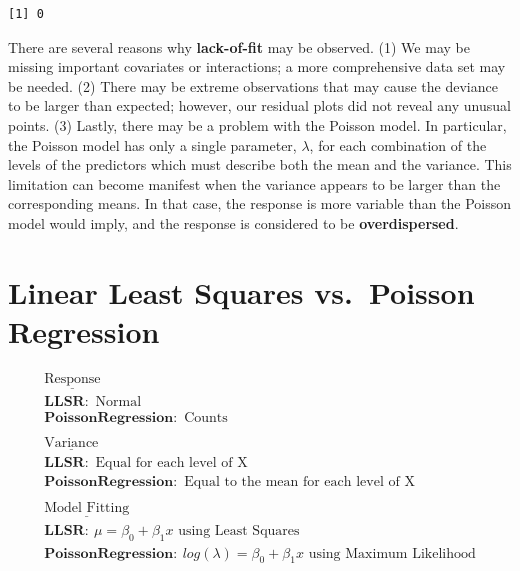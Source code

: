 \documentclass[
]{krantz}
\begin{document}
\begin{verbatim}
[1] 0
\end{verbatim}

There are several reasons why \textbf{lack-of-fit}  may be observed. (1) We may be missing important covariates or interactions; a more comprehensive data set may be needed. (2) There may be extreme observations that may cause the deviance to be larger than expected; however, our residual plots did not reveal any unusual points. (3) Lastly, there may be a problem with the Poisson model. In particular, the Poisson model has only a single parameter, \(\lambda\), for each combination of the levels of the predictors which must describe both the mean and the variance. This limitation can become manifest when the variance appears to be larger than the corresponding means. In that case, the response is more variable than the Poisson model would imply, and the response is considered to be \textbf{overdispersed}. 

\section{\texorpdfstring{Linear Least Squares  vs.~Poisson Regression }{Linear Least Squares  vs.~Poisson Regression }}\label{linear-least-squares-vs.-poisson-regression}

\begin{gather*}
\underline{\textrm{Response}} \\
\mathbf{LLSR:}\textrm{ Normal} \\
\mathbf{Poisson Regression:}\textrm{ Counts} \\
\textrm{ } \\
\underline{\textrm{Variance}} \\
\mathbf{LLSR:}\textrm{ Equal for each level of X} \\
\mathbf{Poisson Regression:}\textrm{ Equal to the mean for each level of X} \\
\textrm{ } \\
\underline{\textrm{Model Fitting}} \\
\mathbf{LLSR:}\ \mu=\beta_0+\beta_1x \textrm{ using Least Squares}\\
\mathbf{Poisson Regression:}\ log(\lambda)=\beta_0+\beta_1x \textrm{ using Maximum Likelihood}\\
\end{gather*}
\end{document}
